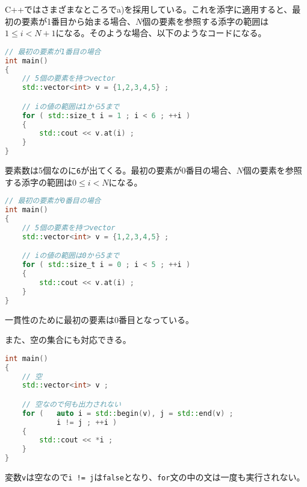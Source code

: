 C++ではさまざまなところでa)を採用している。これを添字に適用すると、最初の要素が1番目から始まる場合、\(N\)個の要素を参照する添字の範囲は\(1 \le i < N+1\)になる。そのような場合、以下のようなコードになる。

\begin{lstlisting}[language={C++}]
// 最初の要素が1番目の場合
int main()
{
    // 5個の要素を持つvector
    std::vector<int> v = {1,2,3,4,5} ;

    // iの値の範囲は1から5まで
    for ( std::size_t i = 1 ; i < 6 ; ++i )
    {
        std::cout << v.at(i) ;
    }    
}
\end{lstlisting}

要素数は5個なのに\texttt{6}が出てくる。最初の要素が0番目の場合、\(N\)個の要素を参照する添字の範囲は\(0 \le i < N\)になる。

\begin{lstlisting}[language={C++}]
// 最初の要素が0番目の場合
int main()
{
    // 5個の要素を持つvector
    std::vector<int> v = {1,2,3,4,5} ;

    // iの値の範囲は0から5まで
    for ( std::size_t i = 0 ; i < 5 ; ++i )
    {
        std::cout << v.at(i) ;
    }    
}
\end{lstlisting}

一貫性のために最初の要素は0番目となっている。

また、空の集合にも対応できる。

\begin{lstlisting}[language={C++}]
int main()
{
    // 空
    std::vector<int> v ;

    // 空なので何も出力されない
    for (   auto i = std::begin(v), j = std::end(v) ;
            i != j ; ++i )
    {
        std::cout << *i ;
    }
}
\end{lstlisting}

変数\texttt{v}は空なので\texttt{i != j}は\texttt{false}となり、\texttt{for}文の中の文は一度も実行されない。
